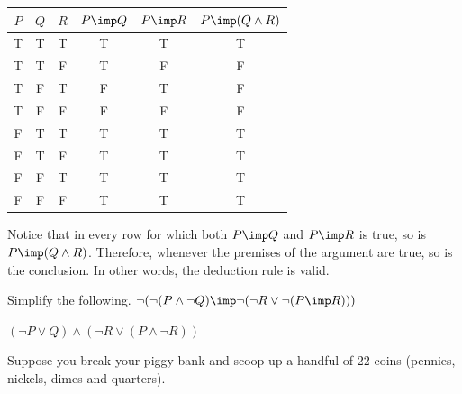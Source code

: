 \begin{questions}
\begin{answer}
    \begin{tabular}{c|c|c||c|c|c}
     $P$ & $Q$ & $R$ & $P \imp Q$ & $P \imp R$ & $P \imp (Q \wedge R)$ \\ \hline
      T  &  T  &  T  &      T     &      T     &   T \\
      T  &  T  &  F  &      T     &      F     &   F \\
      T  &  F  &  T  &      F     &      T     &   F \\
      T  &  F  &  F  &      F     &      F     &   F \\
      F  &  T  &  T  &      T     &      T     &   T \\
      F  &  T  &  F  &      T     &      T     &   T \\
      F  &  F  &  T  &      T     &      T     &   T \\
      F  &  F  &  F  &      T     &      T     &   T
    \end{tabular}

  Notice that in every row for which both $P \imp Q$ and $P \imp R$ is true, so is $P \imp (Q \wedge R)$.  Therefore, whenever the premises of the argument are true, so is the conclusion.  In other words, the deduction rule is valid.
  \end{answer}




\question Simplify the following.
 $\neg (\neg (P \wedge \neg Q) \imp \neg(\neg R \vee \neg(P \imp R)))$



  \begin{answer}
$(\neg P \vee Q) \wedge (\neg R \vee (P \wedge \neg R))$

  \end{answer}


\question Suppose you break your piggy bank and scoop up a handful of 22 coins (pennies, nickels, dimes and quarters).


\end{questions}
